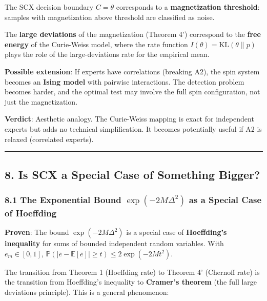 \documentclass[
  12pt,
]{article}
\begin{document}
The SCX decision boundary \(C = \theta\) corresponds to a
\textbf{magnetization threshold}: samples with magnetization above
threshold are classified as noise.

The \textbf{large deviations} of the magnetization (Theorem 4')
correspond to the \textbf{free energy} of the Curie-Weiss model, where
the rate function \(I(\theta) = \text{KL}(\theta\|p)\) plays the role of
the large-deviations rate for the empirical mean.

\textbf{Possible extension}: If experts have correlations (breaking A2),
the spin system becomes an \textbf{Ising model} with pairwise
interactions. The detection problem becomes harder, and the optimal test
may involve the full spin configuration, not just the magnetization.

\textbf{Verdict}: Aesthetic analogy. The Curie-Weiss mapping is exact
for independent experts but adds no technical simplification. It becomes
potentially useful if A2 is relaxed (correlated experts).

\begin{center}\rule{0.5\linewidth}{0.5pt}\end{center}

\subsection{8. Is SCX a Special Case of Something
Bigger?}\label{is-scx-a-special-case-of-something-bigger}

\subsubsection{\texorpdfstring{8.1 The Exponential Bound
\(\exp(-2M\Delta^2)\) as a Special Case of
Hoeffding}{8.1 The Exponential Bound \textbackslash exp(-2M\textbackslash Delta\^{}2) as a Special Case of Hoeffding}}\label{the-exponential-bound-exp-2mdelta2-as-a-special-case-of-hoeffding}

\textbf{Proven}: The bound \(\exp(-2M\Delta^2)\) is a special case of
\textbf{Hoeffding's inequality} for sums of bounded independent random
variables. With \(e_m \in [0,1]\),
\(\mathbb{P}(|\bar{e} - \mathbb{E}[\bar{e}]| \geq t) \leq 2\exp(-2Mt^2)\).

The transition from Theorem 1 (Hoeffding rate) to Theorem 4' (Chernoff
rate) is the transition from Hoeffding's inequality to \textbf{Cramer's
theorem} (the full large deviations principle). This is a general
phenomenon:
\end{document}
